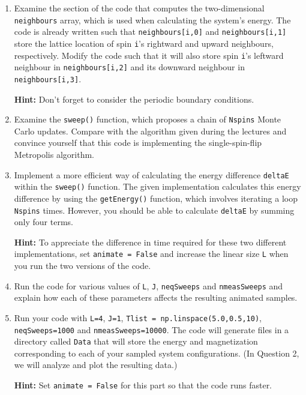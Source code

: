 \documentclass[letterpaper]{scrartcl}
\begin{document}
\begin{enumerate}[label=\alph*)]

\item Examine the section of the code that computes the two-dimensional \texttt{neighbours} array, which is used when calculating the system's energy. 
The code is already written such that \texttt{neighbours[i,0]} and \texttt{neighbours[i,1]} 
store the lattice location of spin \texttt{i}'s rightward and upward neighbours, respectively.
Modify the code such that it will also store spin \texttt{i}'s leftward neighbour in \texttt{neighbours[i,2]} and its downward neighbour in \texttt{neighbours[i,3]}.

\textbf{Hint:} Don't forget to consider the periodic boundary conditions.

\item Examine the \texttt{sweep()} function, which proposes a chain of \texttt{N{\textunderscore}spins} Monte Carlo updates.
Compare with the algorithm given during the lectures and convince yourself that this code is implementing the single-spin-flip Metropolis algorithm.

\item Implement a more efficient way of calculating the energy difference \texttt{deltaE} within the \texttt{sweep()} function. 
The given implementation calculates this energy difference by using the \texttt{getEnergy()} function, 
which involves iterating a loop \texttt{N{\textunderscore}spins} times.
However, you should be able to calculate \texttt{deltaE} by summing only four terms.

\textbf{Hint:} To appreciate the difference in time required for these two different implementations, 
set \texttt{animate = False} and increase the linear size \texttt{L} when you run the two versions of the code.

\item Run the code for various values of \texttt{L}, \texttt{J}, \texttt{n{\textunderscore}eqSweeps} and \texttt{n{\textunderscore}measSweeps} 
and explain how each of these parameters affects the resulting animated samples.

\item Run your code with \texttt{L=4}, \texttt{J=1}, 
\texttt{T{\textunderscore}list = np.linspace(5.0,0.5,10)}, \texttt{n{\textunderscore}eqSweeps=1000} and \texttt{n{\textunderscore}measSweeps=10000}.
The code will generate files in a directory called \texttt{Data} that will store the energy and magnetization 
corresponding to each of your sampled system configurations.
(In Question 2, we will analyze and plot the resulting data.)

\textbf{Hint:} Set \texttt{animate = False} for this part so that the code runs faster.

\end{enumerate}
\end{document}
